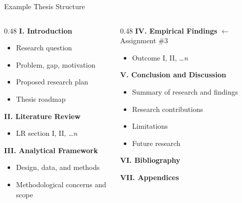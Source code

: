 \documentclass[aspectratio=169,11pt]{beamer}
\begin{document}
\begin{frame}{Example Thesis Structure}
    \begin{columns}[T]
        \begin{column}{0.48\textwidth}
            \textbf{I. Introduction}
            \begin{itemize}
                \footnotesize
                \item Research question
                \item Problem, gap, motivation
                \item Proposed research plan
                \item Thesis roadmap
            \end{itemize}
            \vspace{0.2cm}
            \textbf{II. Literature Review}
            \begin{itemize}
                \footnotesize
                \item LR section I, II, \ldots \textit{n}
            \end{itemize}
            \vspace{0.2cm}
            \textbf{III. Analytical Framework}
            \begin{itemize}
                \footnotesize
                \item Design, data, and methods
                \item Methodological concerns and scope
            \end{itemize}
        \end{column}
        \begin{column}{0.48\textwidth}
            \textbf{IV. Empirical Findings} \textcolor{Terracotta}{$\leftarrow$ Assignment \#3}
            \begin{itemize}
                \footnotesize
                \item Outcome I, II, \ldots \textit{n}
            \end{itemize}
            \vspace{0.2cm}
            \textbf{V. Conclusion and Discussion}
            \begin{itemize}
                \footnotesize
                \item Summary of research and findings
                \item Research contributions
                \item Limitations
                \item Future research
            \end{itemize}
            \vspace{0.2cm}
            \textbf{VI. Bibliography}
            \vspace{0.2cm}

            \textbf{VII. Appendices}
        \end{column}
    \end{columns}
\end{frame}
\end{document}
